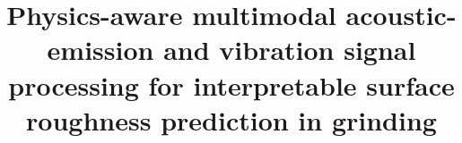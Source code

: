 \documentclass[a4paper,fleqn]{cas-sc}
\begin{document}
\let\WriteBookmarks\relax
\def\floatpagepagefraction{1}
\def\textpagefraction{.001}

\title [mode = title]{Physics-aware multimodal acoustic-emission and vibration signal processing for interpretable surface roughness prediction in grinding}




\maketitle





% 



% 
\clearpage

% 

\end{document}
